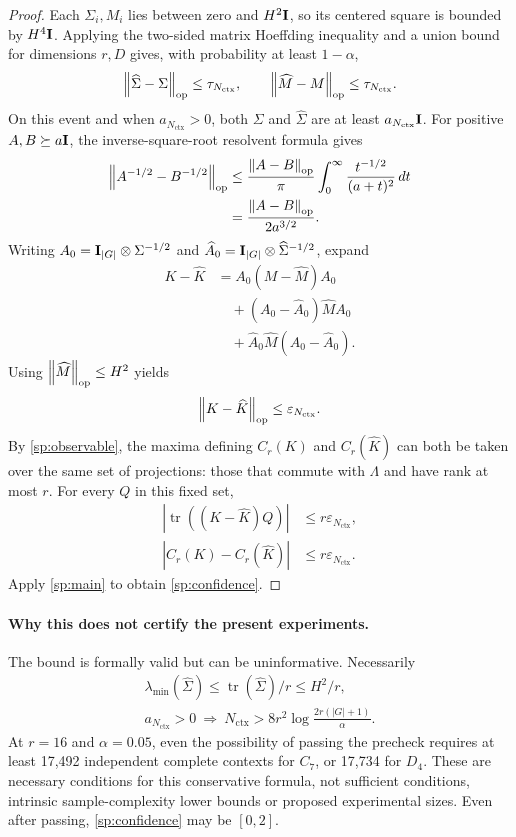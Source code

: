 \begin{proof}
Each $\Sigma_i,M_i$ lies between zero and $H^2\mathbf{I}$, so its centered square is bounded by $H^4\mathbf{I}$. Applying the two-sided matrix Hoeffding inequality \citep[Theorem~1.3]{tropp2012user} and a union bound for dimensions $r,D$ gives, with probability at least $1-\alpha$,
\[
 \left\lVert \widehat\Sigma-\Sigma\right\rVert_{\rm op}\le\tau_{N_{\mathrm{ctx}}},\qquad
 \left\lVert \widehat M-M\right\rVert_{\rm op}\le\tau_{N_{\mathrm{ctx}}}.
\]
On this event and when $a_{N_{\mathrm{ctx}}}>0$, both $\Sigma$ and $\widehat\Sigma$ are at least $a_{N_{\mathrm{ctx}}}\mathbf{I}$. For positive $A,B\succeq a\mathbf{I}$, the inverse-square-root resolvent formula gives
\[
 \begin{aligned}
 \left\lVert A^{-1/2}-B^{-1/2}\right\rVert_{\rm op}
 &\le
 \frac{\left\lVert A-B\right\rVert_{\rm op}}\pi
 \int_0^\infty
 \frac{t^{-1/2}}{(a+t)^2}\,dt
 \\
 &=
 \frac{\left\lVert A-B\right\rVert_{\rm op}}{2a^{3/2}}.
 \end{aligned}
\]
Writing $A_0=\mathbf{I}_{|G|}\otimes\Sigma^{-1/2}$ and $\widehat A_0=\mathbf{I}_{|G|}\otimes\widehat\Sigma^{-1/2}$, expand
\[
 \begin{aligned}
 K-\widehat K
 &=
 A_0(M-\widehat M)A_0
 \\
 &\quad+
 (A_0-\widehat A_0)\widehat M A_0
 \\
 &\quad+
 \widehat A_0\widehat M(A_0-\widehat A_0).
 \end{aligned}
\]
Using $\left\lVert \widehat M\right\rVert_{\rm op}\le H^2$ yields
\[
 \left\lVert K-\widehat K\right\rVert_{\rm op}
 \le\varepsilon_{N_{\mathrm{ctx}}}.
\] By \cref{sp:observable}, the maxima defining $C_r(K)$ and $C_r(\widehat K)$ can both be taken over the same set of projections: those that commute with $\Lambda$ and have rank at most $r$. For every $Q$ in this fixed set,
\[
 \begin{aligned}
 \left|
 \operatorname{tr}((K-\widehat K)Q)
 \right|
 &\le r\varepsilon_{N_{\mathrm{ctx}}},
 \\
 |C_r(K)-C_r(\widehat K)|
 &\le r\varepsilon_{N_{\mathrm{ctx}}}.
 \end{aligned}
\]
Apply \cref{sp:main} to obtain \cref{sp:confidence}.
\end{proof}

\paragraph{Why this does not certify the present experiments.}
The bound is formally valid but can be uninformative. Necessarily
\[
\begin{gathered}
 \lambda_{\min}(\widehat\Sigma)\le\operatorname{tr}(\widehat\Sigma)/r\le H^2/r,\\
 a_{N_{\mathrm{ctx}}}>0\ \Longrightarrow\
 N_{\mathrm{ctx}}>8r^2\log\frac{2r(|G|+1)}\alpha.
\end{gathered}
\]
At $r=16$ and $\alpha=0.05$, even the possibility of passing the precheck requires at least 17,492 independent complete contexts for $C_7$, or 17,734 for $D_4$. These are necessary conditions for this conservative formula, not sufficient conditions, intrinsic sample-complexity lower bounds or proposed experimental sizes. Even after passing, \cref{sp:confidence} may be $[0,2]$.


